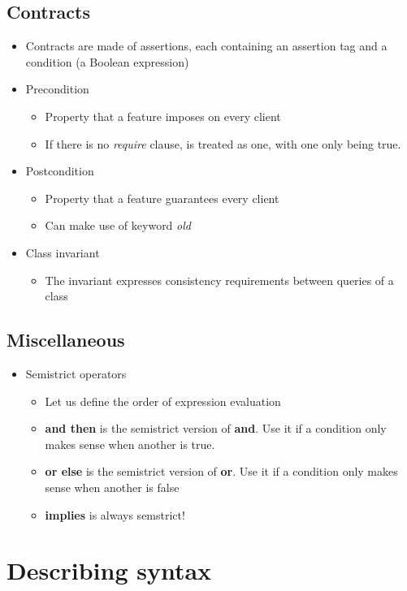 \documentclass[a4paper]{article}
\begin{document}
\subsection{Contracts}
\begin{itemize}
\item Contracts are made of assertions, each containing an assertion tag and a condition (a Boolean expression)
\item Precondition
\begin{itemize}
\item Property that a feature imposes on every client
\item If there is no \textsl{require} clause, is treated as one, with one only being true.
\end{itemize}
\item Postcondition
\begin{itemize}
\item Property that a feature guarantees every client 
\item Can make use of keyword \textsl{old}
\end{itemize}
\item Class invariant
\begin{itemize}
\item The invariant expresses consistency requirements between queries of a class
\end{itemize}
\end{itemize}

\subsection{Miscellaneous}
\begin{itemize}
\item Semistrict operators
\begin{itemize}
\item Let us define the order of expression evaluation
\item \textbf{and then} is the semistrict version of \textbf{and}. Use it if a condition only makes sense when another is true.
\item \textbf{or else} is the semistrict version of \textbf{or}. Use it if a condition only makes sense when another is false
\item\textbf{implies} is always semstrict!
\end{itemize}
\end{itemize}

\section{Describing syntax}
\end{document}
